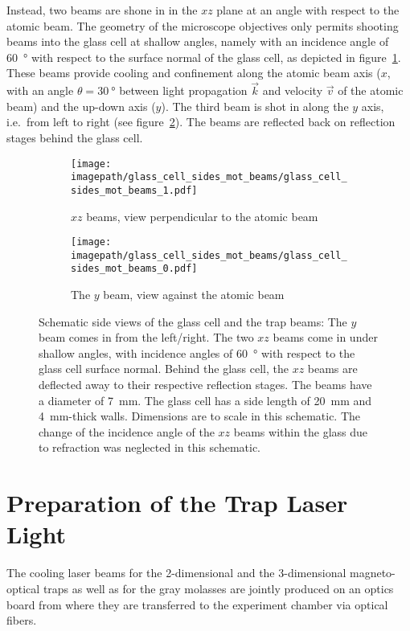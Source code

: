 Instead, two beams are shone in in the $xz$ plane at an angle with respect to the atomic beam. The geometry of the microscope objectives only permits shooting beams into the glass cell at shallow angles, namely with an incidence angle of \SI{60}{\degree} with respect to the surface normal of the glass cell, as depicted in figure~\ref{fig:glass_cell_sides_mot_beams_0}. These beams provide cooling and confinement along the atomic beam axis ($x$, with an angle $\theta = \SI{30}{\degree}$ between light propagation $\vec k$ and velocity $\vec v$ of the atomic beam) and the up-down axis ($y$). The third beam is shot in along the $y$ axis, i.e.\ from left to right (see figure~\ref{fig:glass_cell_sides_mot_beams_1}). The beams are reflected back on reflection stages behind the glass cell.

\begin{figure}
    \centering
    \begin{subfigure}[t]{0.7\textwidth}
        \centering
        \texttt{[image: \\imagepath/glass\_cell\_sides\_mot\_beams/glass\_cell\_sides\_mot\_beams\_1.pdf]}
        \caption{$xz$ beams, view perpendicular to the atomic beam}\label{fig:glass_cell_sides_mot_beams_0}
    \end{subfigure}
    \begin{subfigure}[t]{0.29\textwidth}
        \centering
        \texttt{[image: \\imagepath/glass\_cell\_sides\_mot\_beams/glass\_cell\_sides\_mot\_beams\_0.pdf]}
        \caption{The $y$ beam, view against the atomic beam}\label{fig:glass_cell_sides_mot_beams_1}
    \end{subfigure}
    \caption{Schematic side views of the glass cell and the trap beams: The $y$ beam comes in from the left/right. The two $xz$ beams come in under shallow angles, with incidence angles of \SI{60}{\degree} with respect to the glass cell surface normal. Behind the glass cell, the $xz$ beams are deflected away to their respective reflection stages. The beams have a diameter of \SI{7}{\milli\meter}. The glass cell has a side length of \SI{20}{\milli\meter} and \SI{4}{\milli\meter}-thick walls. Dimensions are to scale in this schematic. The change of the incidence angle of the $xz$ beams within the glass due to refraction was neglected in this schematic.}
    \label{fig:glass_cell_sides_mot_beams}
\end{figure} 

\section{Preparation of the Trap Laser Light}
The cooling laser beams for the 2-dimensional and the 3-dimensional magneto-optical traps as well as for the gray molasses are jointly produced on an optics board from where they are transferred to the experiment chamber via optical fibers.

